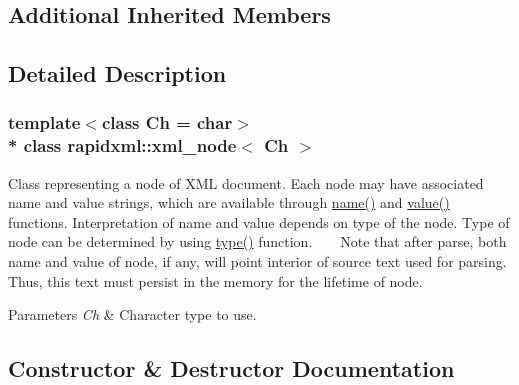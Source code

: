\subsection*{Additional Inherited Members}


\subsection{Detailed Description}
\subsubsection*{template$<$class Ch = char$>$\\*
class rapidxml\+::xml\+\_\+node$<$ Ch $>$}

Class representing a node of X\+ML document. Each node may have associated name and value strings, which are available through \hyperlink{classrapidxml_1_1xml__base_a9a09739310469995db078ebd0da3ed45}{name()} and \hyperlink{classrapidxml_1_1xml__base_adcdaccff61c665f039d9344e447b7445}{value()} functions. Interpretation of name and value depends on type of the node. Type of node can be determined by using \hyperlink{classrapidxml_1_1xml__node_a2c6a4315b98bcfa2e04fed3fa1b22c36}{type()} function. ~\newline
~\newline
 Note that after parse, both name and value of node, if any, will point interior of source text used for parsing. Thus, this text must persist in the memory for the lifetime of node. 
\begin{DoxyParams}{Parameters}
{\em Ch} & Character type to use. \\
\hline
\end{DoxyParams}


\subsection{Constructor \& Destructor Documentation}
